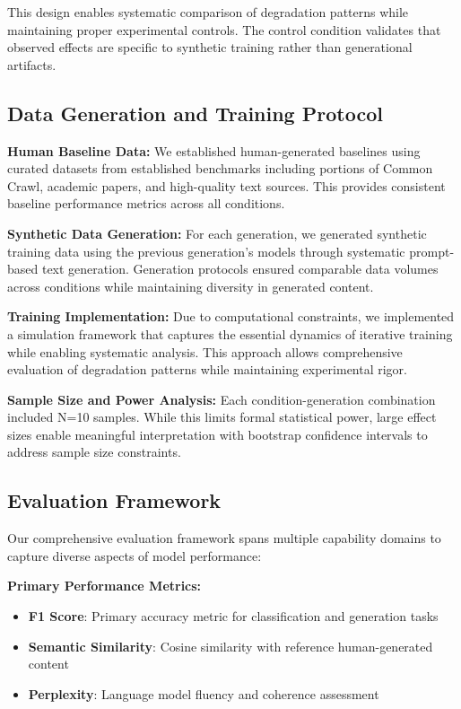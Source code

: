 \documentclass[11pt]{article}
\begin{document}
This design enables systematic comparison of degradation patterns while maintaining proper experimental controls. The control condition validates that observed effects are specific to synthetic training rather than generational artifacts.

\subsection{Data Generation and Training Protocol}

\textbf{Human Baseline Data:} We established human-generated baselines using curated datasets from established benchmarks including portions of Common Crawl, academic papers, and high-quality text sources. This provides consistent baseline performance metrics across all conditions.

\textbf{Synthetic Data Generation:} For each generation, we generated synthetic training data using the previous generation's models through systematic prompt-based text generation. Generation protocols ensured comparable data volumes across conditions while maintaining diversity in generated content.

\textbf{Training Implementation:} Due to computational constraints, we implemented a simulation framework that captures the essential dynamics of iterative training while enabling systematic analysis. This approach allows comprehensive evaluation of degradation patterns while maintaining experimental rigor.

\textbf{Sample Size and Power Analysis:} Each condition-generation combination included N=10 samples. While this limits formal statistical power, large effect sizes enable meaningful interpretation with bootstrap confidence intervals to address sample size constraints.

\subsection{Evaluation Framework}

Our comprehensive evaluation framework spans multiple capability domains to capture diverse aspects of model performance:

\textbf{Primary Performance Metrics:}
\begin{itemize}
    \item \textbf{F1 Score}: Primary accuracy metric for classification and generation tasks
    \item \textbf{Semantic Similarity}: Cosine similarity with reference human-generated content
    \item \textbf{Perplexity}: Language model fluency and coherence assessment
\end{itemize}
\end{document}
